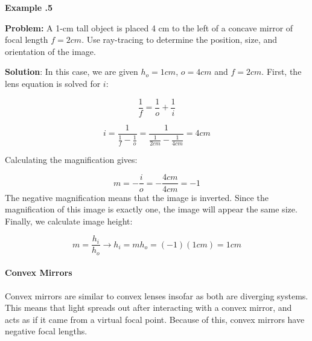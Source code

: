 	\begin{mdframed}[backgroundcolor=blue!10!white]
		\begin{center}	
			\textbf{Example \thesection.5}	
		\end{center}
		
		\textbf{Problem:} A 1-cm tall object is placed 4 cm to the left of a concave mirror of focal length $f=2 \si{cm}$.  Use ray-tracing to determine the position, size, and orientation of the image.  
		
		\textbf{Solution}: In this case, we are given $h_o = 1 \si{cm}$, $o = 4 \si{cm}$ and $f = 2 \si{cm}$.  First, the lens equation is solved for $i$:
		
		\begin{equation*}
			\frac{1}{f} = \frac{1}{o} + \frac{1}{i}  
		\end{equation*}
		
		
		\begin{equation*}
			i = \frac{1}{\frac{1}{f}-\frac{1}{o}} = \frac{1}{\frac{1}{2\si{cm}}-\frac{1}{4\si{cm}}} = \boxed{4 \si{cm}} 
		\end{equation*}
		
		
		Calculating the magnification gives: 
		
		\begin{equation*}
			m = - \frac{i}{o} = -\frac{4\si{cm}}{4\si{cm}} = \boxed{-1}
		\end{equation*}
		The negative magnification means that the image is inverted.  Since the magnification of this image is exactly one, the image will appear the same size.  Finally, we calculate image height:  
		
		\begin{equation*}
			m = \frac{h_i}{h_o} \longrightarrow h_i = m h_o = (-1) (1 \si{cm}) = \boxed{1 \si{cm}}
		\end{equation*}
	\end{mdframed}
		
		
	

		
		\paragraph{Convex Mirrors} 
				Convex mirrors are similar to convex lenses insofar as both are diverging systems.  This means that light spreads out after interacting with a convex mirror, and acts as if it came from a virtual focal point.  Because of this, convex mirrors have negative focal lengths.
				
